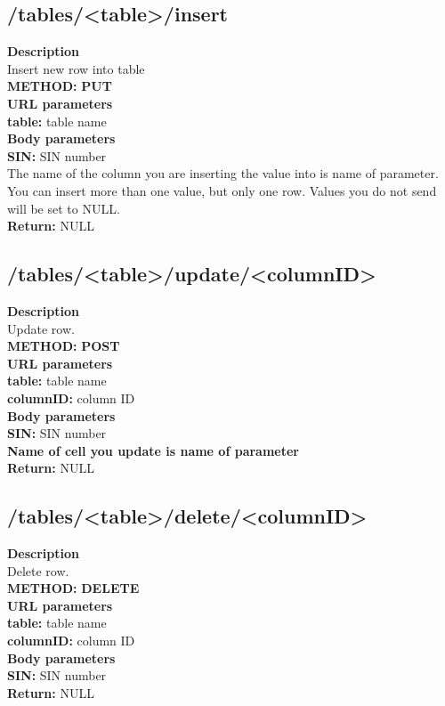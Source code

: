 \documentclass[a4paper, 12pt]{report}
\begin{document}
\subsection{/tables/<table>/insert}
\textbf{\color{redText} Description} \\
Insert new row into table\\
\textbf{\color{redText} METHOD: } \textbf{PUT} \\
\textbf{\color{redText} URL parameters} \\
\textbf{table: } table name\\
\textbf{\color{redText} Body parameters} \\
\textbf{SIN: } SIN number\\
The name of the column you are inserting the value into is name of parameter. You can insert more than one value, but only one row. Values you do not send will be set to NULL.\\
\textbf{\color{redText} Return: } NULL

\subsection{/tables/<table>/update/<columnID>}
\textbf{\color{redText} Description} \\
Update row. \\
\textbf{\color{redText} METHOD: } \textbf{POST} \\
\textbf{\color{redText} URL parameters} \\
\textbf{table: } table name\\
\textbf{columnID: } column ID\\
\textbf{\color{redText} Body parameters} \\
\textbf{SIN: } SIN number\\
\textbf{Name of cell you update is name of parameter}\\
\textbf{\color{redText} Return: } NULL

\subsection{/tables/<table>/delete/<columnID>}
\textbf{\color{redText} Description} \\
Delete row. \\
\textbf{\color{redText} METHOD: } \textbf{DELETE} \\
\textbf{\color{redText} URL parameters} \\
\textbf{table: } table name\\
\textbf{columnID: } column ID\\
\textbf{\color{redText} Body parameters} \\
\textbf{SIN: } SIN number\\
\textbf{\color{redText} Return: } NULL
\end{document}
